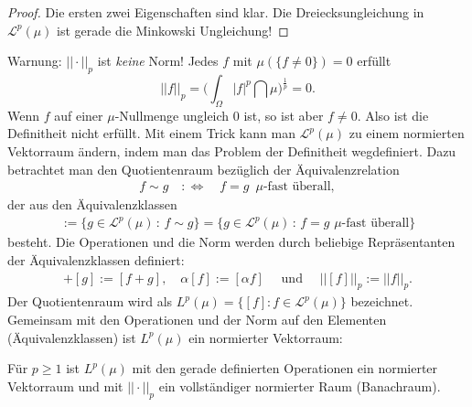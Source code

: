 \begin{proof}
	Die ersten zwei Eigenschaften sind klar. Die Dreiecksungleichung in $\mathcal L^p(\mu)$ ist gerade die Minkowski Ungleichung!
\end{proof}

Warnung: $||\cdot ||_p$ ist \textit{keine} Norm! Jedes $f$ mit $\mu(\{f \neq 0\})=0$ erfüllt \[ || f ||_p = \Big( \int_{\Omega} |f|^p \dint \mu \Big)^{\frac{1}{p}} = 0. \] 
Wenn $f$ auf einer $\mu$-Nullmenge ungleich $0$ ist, so ist aber $f\neq 0$. Also ist die Definitheit nicht erf\"ullt. Mit einem Trick kann man $\mathcal L^p(\mu)$ zu einem normierten Vektorraum \"andern, indem man das Problem der Definitheit wegdefiniert. Dazu betrachtet man den Quotientenraum bez\"uglich der  \"Aquivalenzrelation
\begin{align*}
f \sim g \quad :\Leftrightarrow\quad f = g \,\,\,\mu\text{-fast überall},
\end{align*}
der aus den \"Aquivalenzklassen 
\begin{align*}
[f]:=\big\{g\in \mathcal L^p(\mu)\,:\, f\sim g\big\}=\big\{g\in \mathcal L^p(\mu)\,:\, f=g\,\,\mu\text{-fast \"uberall} \big\}
\end{align*}
besteht. Die Operationen und die Norm werden durch beliebige Repr\"asentanten der \"Aquivalenzklassen definiert:
\begin{align*}
[f]+[g]:=[f+g], \quad \alpha [f]:=[\alpha f] \quad \text{ und }\quad ||[f]||_p:=||f||_p.
\end{align*}
Der Quotientenraum wird als  $L^p(\mu)=\{[f]: f\in \mathcal L^p(\mu)\}$ bezeichnet. Gemeinsam mit den Operationen und der Norm auf den Elementen (\"Aquivalenzklassen) ist $L^p(\mu)$ ein normierter Vektorraum:
\begin{satz}
	F\"ur $p\geq 1$ ist $L^p(\mu)$ mit den gerade definierten Operationen ein normierter Vektorraum und mit $||\cdot||_p$ ein vollst\"andiger normierter Raum (Banachraum).
\end{satz}

